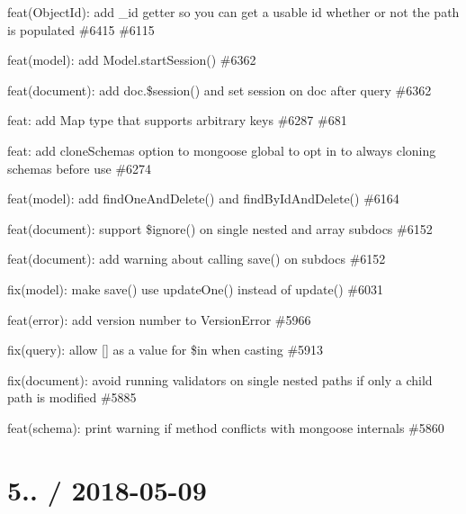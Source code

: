 \begin{DoxyItemize}
\item feat(\+Object\+Id)\+: add {\ttfamily \+\_\+id} getter so you can get a usable id whether or not the path is populated \#6415 \#6115
\item feat(model)\+: add Model.\+start\+Session() \#6362
\item feat(document)\+: add doc.\$session() and set session on doc after query \#6362
\item feat\+: add Map type that supports arbitrary keys \#6287 \#681
\item feat\+: add {\ttfamily clone\+Schemas} option to mongoose global to opt in to always cloning schemas before use \#6274
\item feat(model)\+: add {\ttfamily find\+One\+And\+Delete()} and {\ttfamily find\+By\+Id\+And\+Delete()} \#6164
\item feat(document)\+: support {\ttfamily \$ignore()} on single nested and array subdocs \#6152
\item feat(document)\+: add warning about calling {\ttfamily save()} on subdocs \#6152
\item fix(model)\+: make {\ttfamily save()} use {\ttfamily update\+One()} instead of {\ttfamily update()} \#6031
\item feat(error)\+: add version number to Version\+Error \#5966
\item fix(query)\+: allow {\ttfamily \mbox{[}\mbox{]}} as a value for {\ttfamily \$in} when casting \#5913
\item fix(document)\+: avoid running validators on single nested paths if only a child path is modified \#5885
\item feat(schema)\+: print warning if method conflicts with mongoose internals \#5860
\end{DoxyItemize}

\section*{5.. / 2018-\/05-\/09 }


